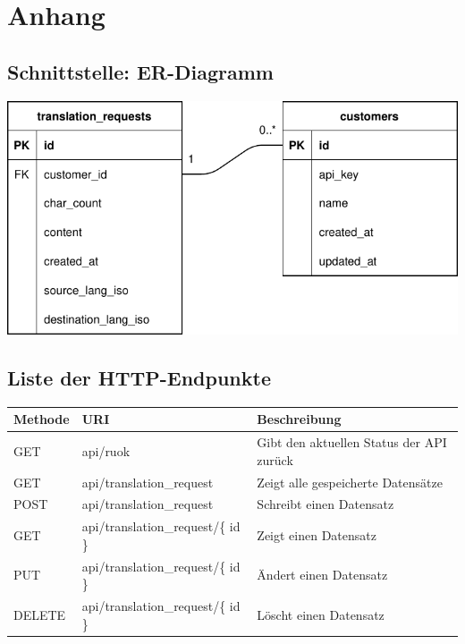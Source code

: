 \renewcommand\thesubsection{\Alph{subsection}}
\section{Anhang}
\subsection{Schnittstelle: ER-Diagramm}
\label{sec:erd-api}
\includegraphics[width=15cm]{./img/ERD-API.pdf}

\subsection{Liste der HTTP-Endpunkte}
\label{sec:table_http_request}
\begin{tabular}{ |l|l|l| }
	\hline
	Methode & URI & Beschreibung \\ 
	\hline
	GET & api/ruok  & Gibt den aktuellen Status der API zurück \\  
	GET & api/translation\_request  & Zeigt alle gespeicherte Datensätze \\  
	POST & api/translation\_request & Schreibt einen Datensatz \\
	GET & api/translation\_request/\{ id \}  & Zeigt einen Datensatz \\  
	PUT & api/translation\_request/\{ id \} & Ändert einen Datensatz \\
	DELETE & api/translation\_request/\{ id \} & Löscht einen Datensatz \\
	\hline
\end{tabular}

